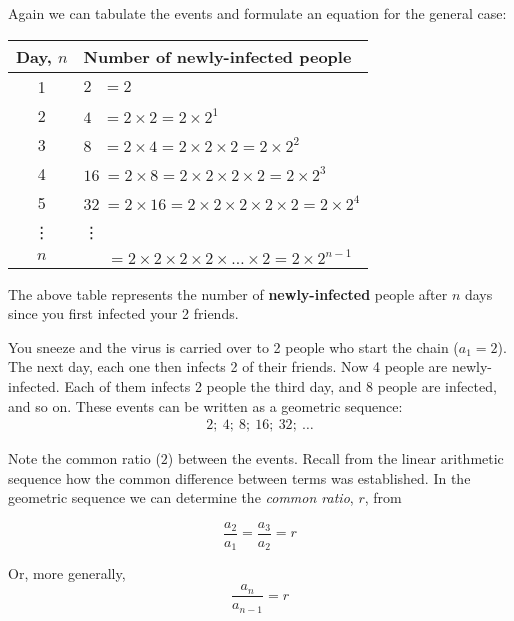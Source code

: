Again we can tabulate the events and formulate an equation for the general case:
\begin{center}
\begin{tabular}{|c|l|}\hline
\hline \textbf{Day}, $n$ & \textbf{Number of newly-infected people} \\\hline
\hline 1 & $2 \: \: \: = 2$ \\
\hline 2 & $4 \: \: \: = 2 \times 2 = 2 \times 2^1 $ \\
\hline 3 & $8 \: \: \: = 2 \times 4 = 2 \times 2 \times 2 = 2 \times 2^2$ \\
\hline 4 & $16 \: = 2 \times 8 = 2 \times 2 \times 2 \times 2 = 2 \times 2^3$ \\
\hline 5 & $32 \: = 2 \times 16 = 2 \times 2 \times 2 \times 2 \times 2 = 2 \times 2^4$ \\
\hline \vdots & \qquad \qquad \qquad \qquad \vdots \\
\hline $n$ & $\: \: \quad = 2 \times 2 \times 2 \times 2 \times \ldots \times 2 = 2 \times 2^{n-1}$
\\
\hline\hline
\end{tabular}
\end{center}

The above table represents the number of \textbf{newly-infected} people after $n$ days since you
first infected your 2 friends. 

You sneeze and the virus is carried over to 2 people who start the chain ($a_1 = 2$).
The next day, each one then infects 2 of their friends. Now 4 people are newly-infected.
Each of them infects 2 people the third day, and 8 people are infected, and so on.
These events can be written as a geometric sequence:
\begin{eqnarray*}
2; \: 4; \: 8; \: 16; \: 32; \: \ldots
\end{eqnarray*}

Note the common ratio ($2$) between the events. Recall from the linear arithmetic sequence how the
common difference between terms was established. In the geometric sequence we can determine the
\textit{common ratio}, $r$, from

\begin{equation}
\frac{a_2}{a_1} = \frac{a_3}{a_2} = r
\end{equation}

Or, more generally,
\begin{equation}
\label{eq:mp:s:geomseq:1}
\frac{a_n}{a_{n-1}} = r
\end{equation}

